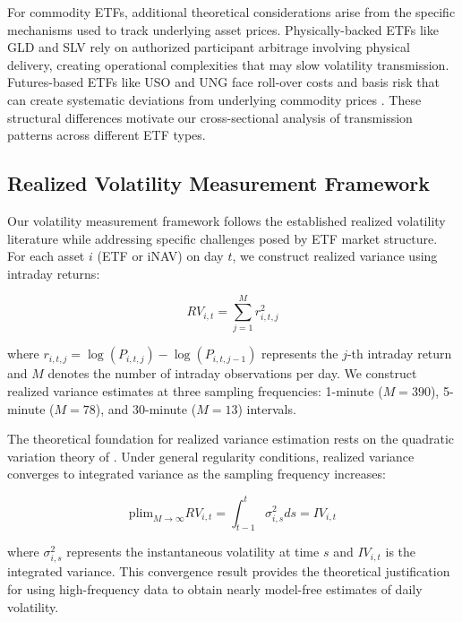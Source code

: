For commodity ETFs, additional theoretical considerations arise from the specific mechanisms used to track underlying asset prices. Physically-backed ETFs like GLD and SLV rely on authorized participant arbitrage involving physical delivery, creating operational complexities that may slow volatility transmission. Futures-based ETFs like USO and UNG face roll-over costs and basis risk that can create systematic deviations from underlying commodity prices \citep{todorov2021etf}. These structural differences motivate our cross-sectional analysis of transmission patterns across different ETF types.

\subsection{Realized Volatility Measurement Framework}

Our volatility measurement framework follows the established realized volatility literature while addressing specific challenges posed by ETF market structure. For each asset $i$ (ETF or iNAV) on day $t$, we construct realized variance using intraday returns:

\begin{equation} \label{eq:realized_variance}
RV_{i,t} = \sum_{j=1}^{M} r_{i,t,j}^2
\end{equation}

where $r_{i,t,j} = \log(P_{i,t,j}) - \log(P_{i,t,j-1})$ represents the $j$-th intraday return and $M$ denotes the number of intraday observations per day. We construct realized variance estimates at three sampling frequencies: 1-minute ($M=390$), 5-minute ($M=78$), and 30-minute ($M=13$) intervals.

The theoretical foundation for realized variance estimation rests on the quadratic variation theory of \citet{barndorff2002econometric}. Under general regularity conditions, realized variance converges to integrated variance as the sampling frequency increases:

\begin{equation} \label{eq:quadratic_variation}
\text{plim}_{M \to \infty} RV_{i,t} = \int_{t-1}^{t} \sigma_{i,s}^2 ds = IV_{i,t}
\end{equation}

where $\sigma_{i,s}^2$ represents the instantaneous volatility at time $s$ and $IV_{i,t}$ is the integrated variance. This convergence result provides the theoretical justification for using high-frequency data to obtain nearly model-free estimates of daily volatility.

